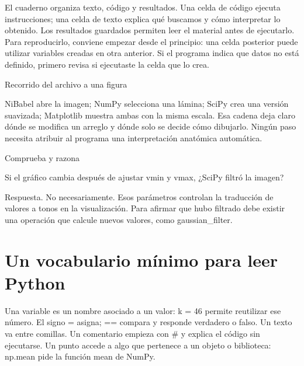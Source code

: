El cuaderno organiza texto, código y resultados. Una celda de código ejecuta instrucciones; una celda de texto explica qué buscamos y cómo interpretar lo obtenido. Los resultados guardados permiten leer el material antes de ejecutarlo. Para reproducirlo, conviene empezar desde el principio: una celda posterior puede utilizar variables creadas en otra anterior. Si el programa indica que datos no está definido, primero revisa si ejecutaste la celda que lo crea.




\begin{Idea}{Recorrido del archivo a una figura}

NiBabel abre la imagen; NumPy selecciona una lámina; SciPy crea una versión suavizada; Matplotlib muestra ambas con la misma escala. Esa cadena deja claro dónde se modifica un arreglo y dónde solo se decide cómo dibujarlo. Ningún paso necesita atribuir al programa una interpretación anatómica automática.


\end{Idea}


\begin{Practica}{Comprueba y razona}

Si el gráfico cambia después de ajustar vmin y vmax, ¿SciPy filtró la imagen?


Respuesta. No necesariamente. Esos parámetros controlan la traducción de valores a tonos en la visualización. Para afirmar que hubo filtrado debe existir una operación que calcule nuevos valores, como gaussian\_filter.


\end{Practica}

\section{Un vocabulario mínimo para leer Python}

Una variable es un nombre asociado a un valor: k = 46 permite reutilizar ese número. El signo = asigna; == compara y responde verdadero o falso. Un texto va entre comillas. Un comentario empieza con \# y explica el código sin ejecutarse. Un punto accede a algo que pertenece a un objeto o biblioteca: np.mean pide la función mean de NumPy.


